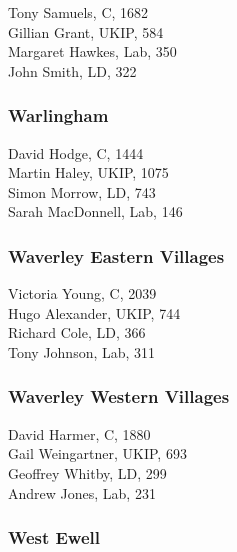 \documentclass[a4paper,openany,10pt]{book}
\begin{document}


Tony Samuels, C, 1682\\
Gillian Grant, UKIP, 584\\
Margaret Hawkes, Lab, 350\\
John Smith, LD, 322\\


\subsubsection*{Warlingham}



David Hodge, C, 1444\\
Martin Haley, UKIP, 1075\\
Simon Morrow, LD, 743\\
Sarah MacDonnell, Lab, 146\\


\subsubsection*{Waverley Eastern Villages}



Victoria Young, C, 2039\\
Hugo Alexander, UKIP, 744\\
Richard Cole, LD, 366\\
Tony Johnson, Lab, 311\\


\subsubsection*{Waverley Western Villages}



David Harmer, C, 1880\\
Gail Weingartner, UKIP, 693\\
Geoffrey Whitby, LD, 299\\
Andrew Jones, Lab, 231\\


\subsubsection*{West Ewell}
\end{document}
